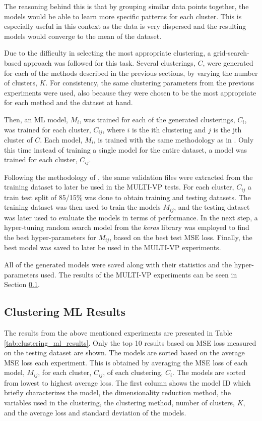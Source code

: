 The reasoning behind this is that by grouping similar data points together, the models would be able to learn more specific patterns for each cluster. This is especially useful in this context as the data is very dispersed and the resulting models would converge to the mean of the dataset. %

Due to the difficulty in selecting the most appropriate clustering, a grid-search-based approach was followed for this task. Several clusterings, $C$, were generated for each of the methods described in the previous sections, by varying the number of clusters, $K$. For consistency, the same clustering parameters from the previous experiments were used, also because they were chosen to be the most appropriate for each method and the dataset at hand.

Then, an ML model, $M_i$, was trained for each of the generated clusterings, $C_i$, was trained for each cluster, $C_{ij}$, where $i$ is the ith clustering and $j$ is the jth cluster of $C$. Each model, $M_i$, is trained with the same methodology as in \cite{barros_InitialConditionEstimation_}. Only this time instead of training a single model for the entire dataset, a model was trained for each cluster, $C_{ij}$. 

Following the methodology of \cite{barros_InitialConditionEstimation_}, the same validation files were extracted from the training dataset to later be used in the MULTI-VP tests. For each cluster, $C_{ij}$ a train test split of 85/15\% was done to obtain training and testing datasets. The training dataset was then used to train the models $M_{ij}$, and the testing dataset was later used to evaluate the models in terms of performance. In the next step, a hyper-tuning random search model from the \textit{keras} \cite{chollet2015keras} library was employed to find the best hyper-parameters for $M_{ij}$, based on the best test MSE loss. Finally, the best model was saved to later be used in the MULTI-VP experiments. 

All of the generated models were saved along with their statistics and the hyper-parameters used. The results of the MULTI-VP experiments can be seen in Section \ref{sec:clustering_ml_results}.

\subsection{Clustering ML Results}\label{sec:clustering_ml_results}
The results from the above mentioned experiments are presented in Table \ref{tab:clustering_ml_results}. Only the top 10 results based on MSE loss measured on the testing dataset are shown. The models are sorted based on the average MSE loss each experiment. This is obtained by averaging the MSE loss of each model, $M_{ij}$, for each cluster, $C_{ij}$, of each clustering, $C_i$. The models are sorted from lowest to highest average loss. The first column shows the model ID which briefly characterizes the model, the dimensionality reduction method, the variables used in the clustering, the clustering method, number of clusters, $K$, and the average loss and standard deviation of the models.


